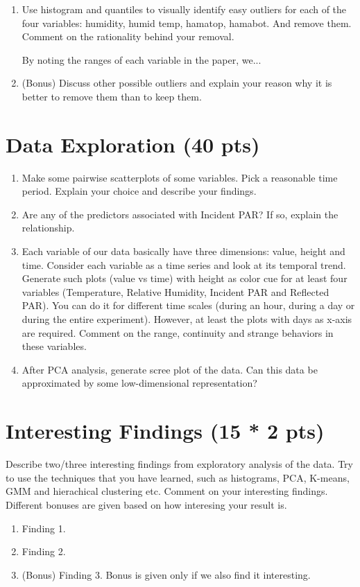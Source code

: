 \documentclass[11pt]{article}
\begin{document}
\begin{enumerate}[label=(\alph*)]
\item Use histogram and quantiles to visually identify easy outliers for each of the four variables: humidity, humid temp, hamatop, hamabot. And remove them. Comment on the rationality behind your removal.

By noting the ranges of each variable in the paper, we...

\item (Bonus) Discuss other possible outliers and explain your reason why it is better to remove them than to keep them.
\end{enumerate}

\section{Data Exploration (40 pts)}
\begin{enumerate}[label=(\alph*)]
\item Make some pairwise scatterplots of some variables. Pick a reasonable time period. Explain your choice and describe your findings.
\item Are any of the predictors associated with Incident PAR? If so, explain the relationship.
\item Each variable of our data basically have three dimensions: value, height and time. Consider each variable as a time series and look at its temporal trend. Generate such plots (value vs time) with height as color cue for at least four variables (Temperature, Relative Humidity, Incident PAR and Reflected PAR). You can do it for different time scales (during an hour, during a day or during the entire experiment). However, at least the plots with days as x-axis are required. Comment on the range, continuity and strange behaviors in these variables.
\item After PCA analysis, generate scree plot of the data. Can this data be approximated by some low-dimensional representation?
\end{enumerate}

\section{Interesting Findings (15 * 2 pts)}
Describe two/three interesting findings from exploratory analysis of the data. Try to use the techniques that you have learned, such as histograms, PCA, K-means, GMM and hierachical clustering etc. Comment on your interesting findings. Different bonuses are given based on how interesing your result is.
\begin{enumerate}[label=(\alph*)]
\item Finding 1.
\item Finding 2.
\item (Bonus) Finding 3. Bonus is given only if we also find it interesting.
\end{enumerate}
\end{document}
